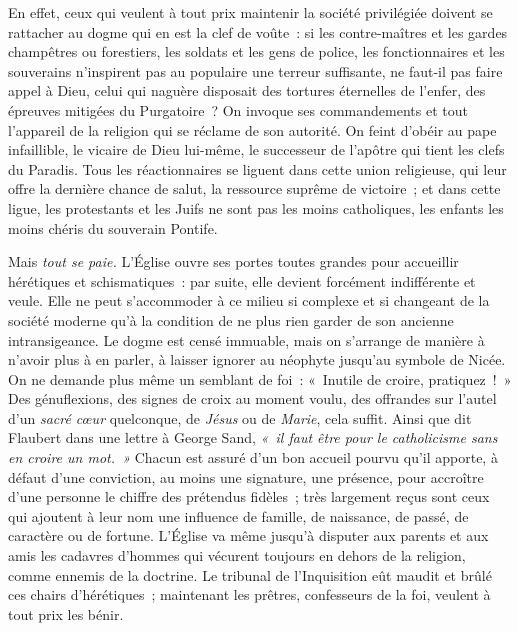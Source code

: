 \documentclass[french,twoside]{book} %
\begin{document}
En effet, ceux qui veulent à tout prix maintenir la société privilégiée doivent se rattacher au dogme qui en est la clef de voûte : si les contre-maîtres et les gardes champêtres ou forestiers, les soldats et les gens de police, les fonctionnaires et les souverains n’inspirent pas au populaire  une terreur suffisante, ne faut-il pas faire appel à Dieu, celui qui naguère disposait des tortures éternelles de l’enfer, des épreuves mitigées du Purgatoire ? On invoque ses commandements et tout l’appareil de la religion qui se réclame de son autorité. On feint d’obéir au pape infaillible, le vicaire de Dieu lui-même, le successeur de l’apôtre qui tient les clefs du Paradis. Tous les réactionnaires se liguent dans cette union religieuse, qui leur offre la dernière chance de salut, la ressource suprême de victoire ; et dans cette ligue, les protestants et les Juifs ne sont pas les moins catholiques, les enfants les moins chéris du souverain Pontife.\par
Mais \emph{tout se paie.} L’Église ouvre ses portes toutes grandes pour accueillir  hérétiques et schismatiques : par suite, elle devient forcément indifférente et veule. Elle ne peut s’accommoder à ce milieu si complexe et si changeant de la société moderne qu’à la condition de ne plus rien garder de son ancienne intransigeance. Le dogme est censé immuable, mais on s’arrange de manière à n’avoir plus à en parler, à laisser ignorer au néophyte jusqu’au symbole de Nicée. On ne demande plus même un semblant de foi : « Inutile de croire, pratiquez ! » Des génuflexions, des signes de croix au moment voulu, des offrandes sur l’autel d’un \emph{sacré cœur} quelconque, de \emph{Jésus} ou de \emph{Marie}, cela suffit. Ainsi que dit Flaubert dans une lettre à George Sand, \emph{« il faut être pour le catholicisme sans en croire un mot. »}  Chacun est assuré d’un bon accueil pourvu qu’il apporte, à défaut d’une conviction, au moins une signature, une présence, pour accroître d’une personne le chiffre des prétendus fidèles ; très largement reçus sont ceux qui ajoutent à leur nom une influence de famille, de naissance, de passé, de caractère ou de fortune. L’Église va même jusqu’à disputer aux parents et aux amis les cadavres d’hommes qui vécurent toujours en dehors de la religion, comme ennemis de la doctrine. Le tribunal de l’Inquisition eût maudit et brûlé ces chairs d’hérétiques ; maintenant les prêtres, confesseurs de la foi, veulent à tout prix les bénir.\par
\end{document}
